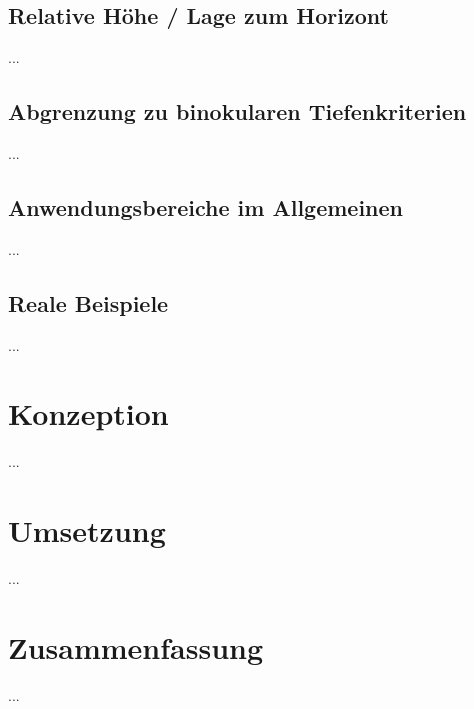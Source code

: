 \subsection{Relative Höhe / Lage zum Horizont}
...

\subsection{Abgrenzung zu binokularen Tiefenkriterien}
...

\subsection{Anwendungsbereiche im Allgemeinen}
...

\subsection{Reale Beispiele}
...

\section{Konzeption}
...

\section{Umsetzung}
...

\section{Zusammenfassung}
...